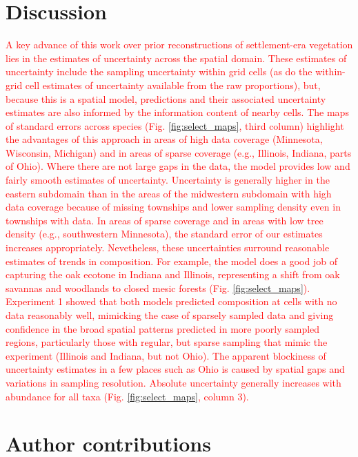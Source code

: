 \documentclass[12pt]{article}\usepackage[]{graphicx}\usepackage[]{color}
\begin{document}
\section{Discussion\label{sec:Discussion}}

\textcolor{red}{A key advance of this work over prior reconstructions
of settlement-era vegetation lies in the estimates of uncertainty
across the spatial domain. These estimates of uncertainty include
the sampling uncertainty within grid cells (as do the within-grid
cell estimates of uncertainty available from the raw proportions),
but, because this is a spatial model, predictions and their associated
uncertainty estimates are also informed by the information content
of nearby cells. The maps of standard errors across species (Fig.
\ref{fig:select_maps}, third column) highlight the advantages of
this approach in areas of high data coverage (Minnesota, Wisconsin,
Michigan) and in areas of sparse coverage (e.g., Illinois, Indiana,
parts of Ohio). Where there are not large gaps in the data, the model
provides low and fairly smooth estimates of uncertainty. Uncertainty
is generally higher in the eastern subdomain than in the areas of
the midwestern subdomain with high data coverage because of missing
townships and lower sampling density even in townships with data.
In areas of sparse coverage and in areas with low tree density (e.g.,
southwestern Minnesota), the standard error of our estimates increases
appropriately. Nevetheless, these uncertainties surround reasonable
estimates of trends in composition. For example, the model does a
good job of capturing the oak ecotone in Indiana and Illinois, representing
a shift from oak savannas and woodlands to closed mesic forests (Fig.
\ref{fig:select_maps}). Experiment 1 showed that both models predicted
composition at cells with no data reasonably well, mimicking the case
of sparsely sampled data and giving confidence in the broad spatial
patterns predicted in more poorly sampled regions, particularly those
with regular, but sparse sampling that mimic the experiment (Illinois
and Indiana, but not Ohio). The apparent blockiness of uncertainty
estimates in a few places such as Ohio is caused by spatial gaps and
variations in sampling resolution. Absolute uncertainty generally
increases with abundance for all taxa (Fig. \ref{fig:select_maps},
column 3).}




\section*{Author contributions}
\end{document}
